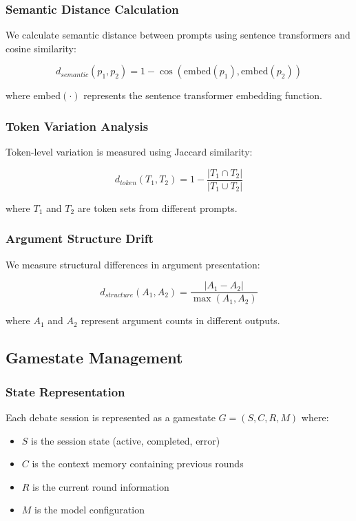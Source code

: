 \documentclass[11pt]{article}
\begin{document}
\subsubsection{Semantic Distance Calculation}

We calculate semantic distance between prompts using sentence transformers and cosine similarity:

\begin{equation}
d_{semantic}(p_1, p_2) = 1 - \cos(\text{embed}(p_1), \text{embed}(p_2))
\end{equation}

where $\text{embed}(\cdot)$ represents the sentence transformer embedding function.

\subsubsection{Token Variation Analysis}

Token-level variation is measured using Jaccard similarity:

\begin{equation}
d_{token}(T_1, T_2) = 1 - \frac{|T_1 \cap T_2|}{|T_1 \cup T_2|}
\end{equation}

where $T_1$ and $T_2$ are token sets from different prompts.

\subsubsection{Argument Structure Drift}

We measure structural differences in argument presentation:

\begin{equation}
d_{structure}(A_1, A_2) = \frac{|A_1 - A_2|}{\max(A_1, A_2)}
\end{equation}

where $A_1$ and $A_2$ represent argument counts in different outputs.

\subsection{Gamestate Management}

\subsubsection{State Representation}

Each debate session is represented as a gamestate $G = (S, C, R, M)$ where:
\begin{itemize}
    \item $S$ is the session state (active, completed, error)
    \item $C$ is the context memory containing previous rounds
    \item $R$ is the current round information
    \item $M$ is the model configuration
\end{itemize}
\end{document}
